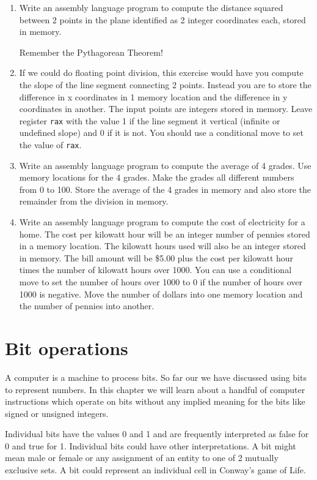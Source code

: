 \documentclass[11pt,b5paper]{book}
\begin{document}
\begin{enumerate}
\item Write an assembly language program to compute the distance squared
between 2 points in the plane identified as 2 integer coordinates each, stored in memory.

Remember the Pythagorean Theorem!

\item If we could do floating point division, this exercise would have you compute the slope of the line segment connecting 2 points.
Instead you are to store the difference in x coordinates in 1 memory location and the difference in y coordinates in another.
The input points are integers stored in memory.
Leave register {\tt rax} with the value 1 if the line segment it vertical
(infinite or undefined slope)
and 0 if it is not.
You should use a conditional move to set the value of {\tt rax}.

\item Write an assembly language program to compute the average of 4 grades.
Use memory locations for the 4 grades.
Make the grades all different numbers from 0 to 100.
Store the average of the 4 grades in memory and also store the remainder from
the division in memory.

\item Write an assembly language program to compute the cost of electricity
for a home.
The cost per kilowatt hour will be an integer number of pennies stored in a memory location.
The kilowatt hours used will also be an integer stored in memory.
The bill amount will be \$5.00 plus the cost per kilowatt hour times the
number of kilowatt hours over 1000.
You can use a conditional move to set the number of hours over 1000 to 0 if
the number of hours over 1000 is negative.
Move the number of dollars into one memory location and the number of pennies
into another.

\end{enumerate}

\chapter{Bit operations}

A computer is a machine to process bits.
So far our we have discussed using bits to represent numbers.
In this chapter we will learn about a handful of computer instructions which
operate on bits without any implied meaning for the bits like signed or
unsigned integers.

Individual bits have the values 0 and 1 and are frequently interpreted as
false for 0 and true for 1.
Individual bits could have other interpretations.
A bit might mean male or female or any assignment of an entity to one of 2
mutually exclusive sets.
A bit could represent an individual cell in Conway's game of Life.
\end{document}
